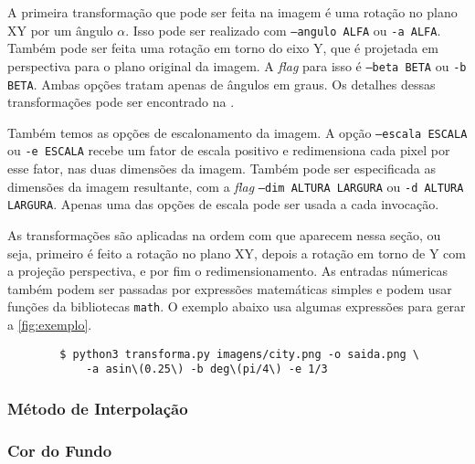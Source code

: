     A primeira transformação que pode ser feita na imagem é uma rotação no plano XY por um ângulo $\alpha$. Isso pode ser realizado com \texttt{--angulo ALFA} ou \texttt{-a ALFA}. Também pode ser feita uma rotação em torno do eixo Y, que é projetada em perspectiva para o plano original da imagem. A \textit{flag} para isso é \texttt{--beta BETA} ou \texttt{-b BETA}. Ambas opções tratam apenas de ângulos em graus. Os detalhes dessas transformações pode ser encontrado na .


    Também temos as opções de escalonamento da imagem. A opção \texttt{--escala ESCALA} ou \texttt{-e ESCALA} recebe um fator de escala positivo e redimensiona cada pixel por esse fator, nas duas dimensões da imagem. Também pode ser especificada as dimensões da imagem resultante, com a \textit{flag} \texttt{--dim ALTURA LARGURA} ou \texttt{-d ALTURA LARGURA}. Apenas uma das opções de escala pode ser usada a cada invocação.

    As transformações são aplicadas na ordem com que aparecem nessa seção, ou seja, primeiro é feito a rotação no plano XY, depois a rotação em torno de Y com a projeção perspectiva, e por fim o redimensionamento. As entradas númericas também podem ser passadas por expressões matemáticas simples e podem usar funções da bibliotecas \texttt{math}. O exemplo abaixo usa algumas expressões para gerar a \cref{fig:exemplo}.

    \begin{verbatim}
        $ python3 transforma.py imagens/city.png -o saida.png \
            -a asin\(0.25\) -b deg\(pi/4\) -e 1/3
    \end{verbatim}

\subsubsection{Método de Interpolação}


\subsubsection{Cor do Fundo}


